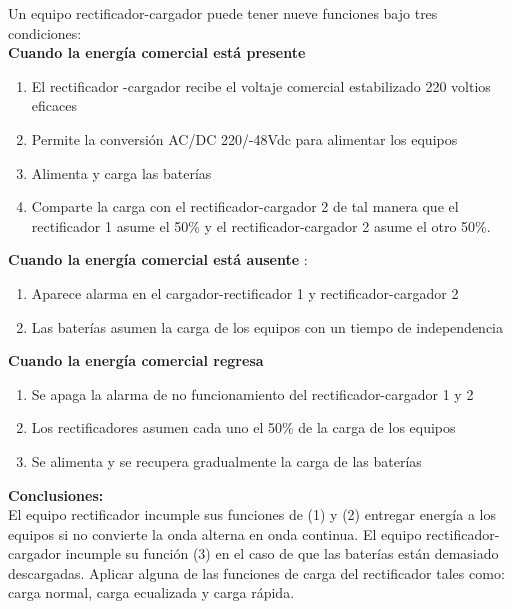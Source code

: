 \documentclass[
	12pt, %
	fleqn, %
	a4paper, %
	oneside, %
]{LegrandOrangeBook}
\begin{document}
\begin{example}
Un equipo rectificador-cargador puede tener nueve funciones bajo tres condiciones:\\
\textbf{Cuando la energía comercial está presente}
\begin{enumerate}
\item El rectificador -cargador recibe el voltaje comercial estabilizado 220 voltios eficaces
\item Permite la conversión AC/DC 220/-48Vdc para alimentar los equipos
\item Alimenta y carga las baterías
\item Comparte la carga con el rectificador-cargador 2 de tal manera que el rectificador 1 asume
el 50\% y el rectificador-cargador 2 asume el otro 50\%.
\end{enumerate}
\textbf{Cuando la energía comercial está ausente
}:
\begin{enumerate}
\item Aparece alarma en el cargador-rectificador 1 y rectificador-cargador 2
\item Las baterías asumen la carga de los equipos con un tiempo de independencia
\end{enumerate}
\textbf{Cuando la energía comercial regresa}
\begin{enumerate}
\item Se apaga la alarma de no funcionamiento del rectificador-cargador 1 y 2
\item Los rectificadores asumen cada uno el 50\% de la carga de los equipos
\item Se alimenta y se recupera gradualmente la carga de las baterías
\end{enumerate}
\textbf{Conclusiones:}\\
El equipo rectificador incumple sus funciones de (1) y (2) entregar energía a los equipos si no convierte la onda alterna en onda continua. El equipo rectificador-cargador incumple su función (3) en el caso de que las baterías están demasiado descargadas. Aplicar alguna de las funciones de carga del rectificador tales como: carga normal, carga ecualizada y carga rápida.
\end{example}
\end{document}
